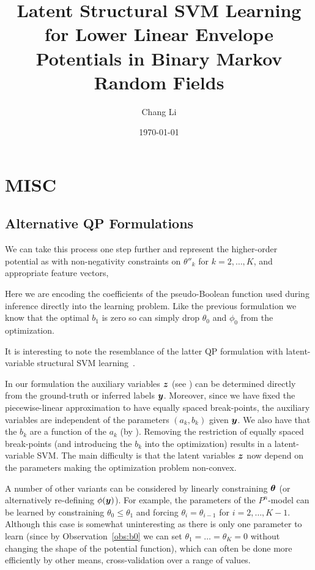 \documentclass[twoside,doublespace,onecolumn,11pt,a4paper]{book}
\title{Latent Structural SVM Learning for Lower Linear
  Envelope Potentials in Binary Markov Random Fields}
\author{Chang Li} \date{\today}
\renewcommand{\cite}{\citep}
\begin{document}
\section{MISC}
\label{sec:MISC}

\subsection{Alternative QP Formulations}

We can take this process one step further and represent the
higher-order potential as with non-negativity constraints on
$\theta''_k$ for $k = 2, \ldots, K$, and appropriate feature
vectors, \ie

Here we are encoding the coefficients of the pseudo-Boolean
function used during inference directly into the learning
problem. Like the previous formulation we know that the optimal
$b_1$ is zero so can simply drop $\theta_0$ and $\phi_0$ from the
optimization.

It is interesting to note the resemblance of the latter QP
formulation with latent-variable structural SVM
learning~\cite{Yu:ICML09}.

In our formulation the auxiliary variables ${\boldsymbol{z}}$ (see
) can be determined directly from the
ground-truth or inferred labels ${\boldsymbol{y}}$. Moreover, since we have
fixed the piecewise-linear approximation to have equally spaced
break-points, the auxiliary variables are independent of the
parameters $(a_k, b_k)$ given ${\boldsymbol{y}}$. We also have that the $b_k$
are a function of the $a_k$ (by ). Removing the
restriction of equally spaced break-points (and introducing the
$b_k$ into the optimization) results in a latent-variable SVM.
The main difficulty is that the latent variables ${\boldsymbol{z}}$ now depend
on the parameters making the optimization problem non-convex.

A number of other variants can be considered by linearly
constraining $\boldsymbol{\theta}$ (or alternatively re-defining
$\phi({\boldsymbol{y}})$). For example, the parameters of the $P^{n}$-model
can be learned by constraining $\theta_0 \leq \theta_1$ and
forcing $\theta_i = \theta_{i-1}$ for $i = 2, \ldots, K - 1$.
Although this case is somewhat uninteresting as there is only one
parameter to learn (since by Observation~\ref{obs:b0} we can set
$\theta_1 = \ldots = \theta_K = 0$ without changing the shape of
the potential function), which can often be done more efficiently
by other means, \eg cross-validation over a range of values.
\end{document}
